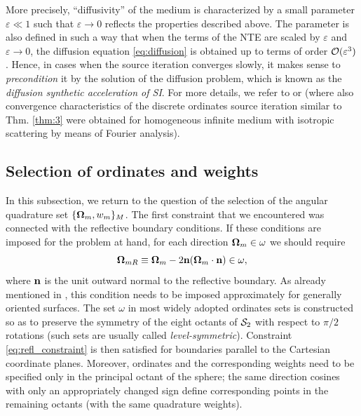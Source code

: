 More precisely, 
``diffusivity'' of the medium is characterized by a small parameter $\varepsilon \ll 1$ such that $\varepsilon\to 0$ 
reflects the properties described above. The parameter is also defined in such a way that when the terms of the NTE are 
scaled by $\varepsilon$ and $\varepsilon \to 0$, the diffusion equation \eqref{eq:diffusion} is obtained up to terms of
order $\mathcal{O}(\varepsilon^3)$. Hence, in cases when the source iteration converges slowly, it makes sense to 
\textit{precondition} it by the solution of the diffusion problem, which is known as the \textit{diffusion synthetic
acceleration of SI}. For more details, we refer to \cite[Chap. 1]{Azmy1} or \cite[Sec. III]{Adams} (where also
convergence characteristics of the discrete ordinates source iteration similar to Thm. \ref{thm:3} were obtained for
homogeneous infinite medium with isotropic scattering by means of Fourier analysis).

\subsection{Selection of ordinates and weights}\label{sec:ordinates}
In this subsection, we return to the question of the selection of the angular quadrature set
$\{\mathbf{\Omega}_m,w_m\}_{M}$.
The first constraint that we encountered was connected with the reflective boundary conditions. If these conditions are
imposed for the problem at hand, for each direction $\mathbf{\Omega}_m\in\omega$ we should require 
\begin{equation}\label{eq:refl_constraint}
	\mathbf{\Omega}_{mR} \equiv \mathbf{\Omega}_m - 2 \mathbf{n} (\mathbf{\Omega}_m \cdot \mathbf{n}) \in \omega,
\end{equation}
where $\mathbf{n}$ is the unit outward normal to the reflective boundary. As already mentioned in , this
condition needs to be imposed approximately for generally oriented surfaces. The set $\omega$ in most widely adopted
ordinates sets is constructed so as to preserve the symmetry of the eight octants of $\mathcal{S}_2$ with respect to $\pi/2$
rotations (such sets are usually called \textit{level-symmetric}). Constraint \eqref{eq:refl_constraint} is then
satisfied for boundaries parallel to the Cartesian coordinate planes. Moreover, ordinates and the corresponding weights 
need to be specified only in the principal octant of the sphere; the same direction cosines with only an appropriately 
changed sign define corresponding points in the remaining octants (with the same quadrature weights).

